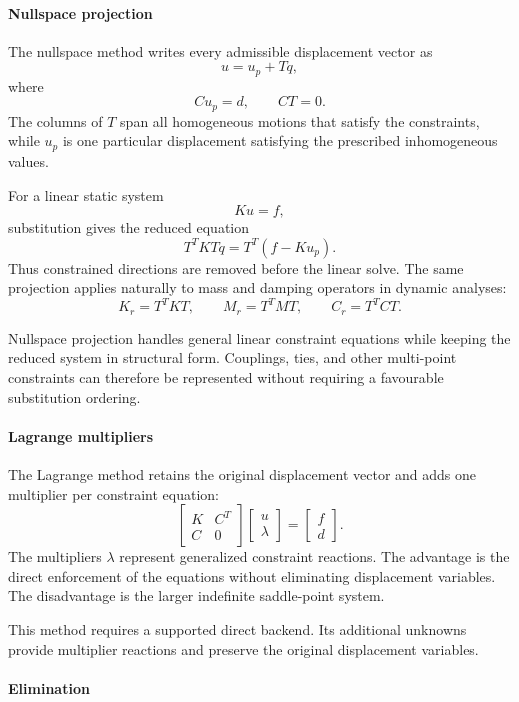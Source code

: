 \paragraph*{Nullspace projection}

The nullspace method writes every admissible displacement vector as
\[
u=u_p+Tq,
\]
where
\[
Cu_p=d,\qquad CT=0.
\]
The columns of \(T\) span all homogeneous motions that satisfy the constraints, while \(u_p\) is one particular displacement satisfying the prescribed inhomogeneous values.

For a linear static system
\[
Ku=f,
\]
substitution gives the reduced equation
\[
T^TKTq=T^T(f-Ku_p).
\]
Thus constrained directions are removed before the linear solve. The same projection applies naturally to mass and damping operators in dynamic analyses:
\[
K_r=T^TKT,\qquad
M_r=T^TMT,\qquad
C_r=T^TCT.
\]

Nullspace projection handles general linear constraint equations while keeping the reduced system in structural form. Couplings, ties, and other multi-point constraints can therefore be represented without requiring a favourable substitution ordering.

\paragraph*{Lagrange multipliers}

The Lagrange method retains the original displacement vector and adds one multiplier per constraint equation:
\[
\begin{bmatrix}
K&C^T\\
C&0
\end{bmatrix}
\begin{bmatrix}u\\\lambda\end{bmatrix}
=
\begin{bmatrix}f\\d\end{bmatrix}.
\]
The multipliers \(\lambda\) represent generalized constraint reactions. The advantage is the direct enforcement of the equations without eliminating displacement variables. The disadvantage is the larger indefinite saddle-point system.

This method requires a supported direct backend. Its additional unknowns provide multiplier reactions and preserve the original displacement variables.

\paragraph*{Elimination}

